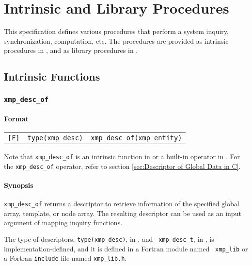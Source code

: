 \chapter{Intrinsic and Library Procedures}
\label{chap:Intrinsic and library procedures}

This specification defines various procedures that perform a system
inquiry, synchronization, computation, etc. The procedures are provided
as intrinsic procedures in {\XMPF}, and as library procedures in {\XMPC}.

\section{Intrinsic Functions}

\subsection{{\tt xmp\_desc\_of}}
\label{subsec: xmp_desc_of}

\subsubsection*{Format}

\begin{tabular}{lll}

\verb![F]!&  {\tt type(xmp\_desc)}& {\tt xmp\_desc\_of(xmp\_entity)}\\

\end{tabular}

\vspace{0.3cm}

Note that {\tt xmp\_desc\_of} is an intrinsic function in {\XMPF} or
a built-in operator in {\XMPC}. For the {\tt xmp\_desc\_of} operator,
refer to section \ref{sec:Descriptor of Global Data in C}.

\subsubsection*{Synopsis}

{\tt xmp\_desc\_of} returns a descriptor to retrieve information of the
specified global array, template, or node array. The resulting
descriptor can be used as an input argument of mapping inquiry functions.

The type of descriptors, {\tt type(xmp\_desc)}, in {\XMPF}, and {\tt
xmp\_desc\_t}, in {\XMPC}, is
implementation-defined, and it is defined in a Fortran module named {\tt
xmp\_lib} or a Fortran {\tt include} file named {\tt xmp\_lib.h}.

